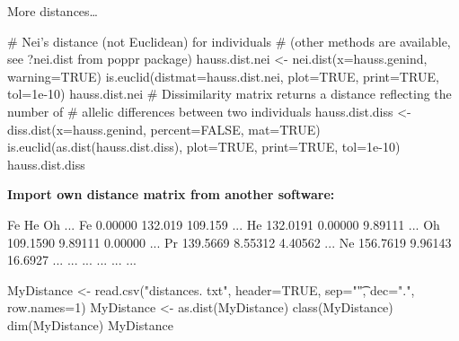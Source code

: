 \documentclass[compress, ucs, xelatex, 11pt, xcolor=svgnames,
	hyperref={
		bookmarks=true,
		unicode=true,
		colorlinks=true,
		pdftitle={Molecular data in R},
		plainpages=false,
		pdfauthor={Vojtech Zeisek},
		pdfsubject={Course about phylogeny and evolution in R},
		pdfcreator={XeLaTeX},
		pdfkeywords={R, evolution, phylogeny, molecular data},
		linkcolor=Tomato,
		anchorcolor=SaddleBrown,
		citecolor=Goldenrod,
		filecolor=DarkMagenta,
		menucolor=Sienna,
		urlcolor=DarkTurquoise,
		pdftex},
	url={hyphens, lowtilde} %
	]{beamer}
\begin{document}
\begin{frame}[fragile]{More distances\ldots}
	\begin{spluscode}
    # Nei's distance (not Euclidean) for individuals
    # (other methods are available, see ?nei.dist from poppr package)
    hauss.dist.nei <- nei.dist(x=hauss.genind, warning=TRUE)
    is.euclid(distmat=hauss.dist.nei, plot=TRUE, print=TRUE, tol=1e-10)
    hauss.dist.nei
    # Dissimilarity matrix returns a distance reflecting the number of
    # allelic differences between two individuals
    hauss.dist.diss <- diss.dist(x=hauss.genind, percent=FALSE, mat=TRUE)
    is.euclid(as.dist(hauss.dist.diss), plot=TRUE, print=TRUE, tol=1e-10)
    hauss.dist.diss
	\end{spluscode}
	\vfill
	\textbf{Import own distance matrix from another software:}
	\begin{multicols}{2}
		\begin{spluscode}
       Fe       He      Oh      ...
    Fe 0.00000  132.019 109.159 ...
    He 132.0191 0.00000 9.89111 ...
    Oh 109.1590 9.89111 0.00000 ...
    Pr 139.5669 8.55312 4.40562 ...
    Ne 156.7619 9.96143 16.6927 ...
    ... ...     ...     ...     ...
		\end{spluscode}
		\columnbreak
		\begin{spluscode}
    MyDistance <- read.csv("distances.
      txt", header=TRUE, sep="\t",
      dec=".", row.names=1)
    MyDistance <- as.dist(MyDistance)
    class(MyDistance)
    dim(MyDistance)
    MyDistance
		\end{spluscode}
	\end{multicols}
\end{frame}
\end{document}
